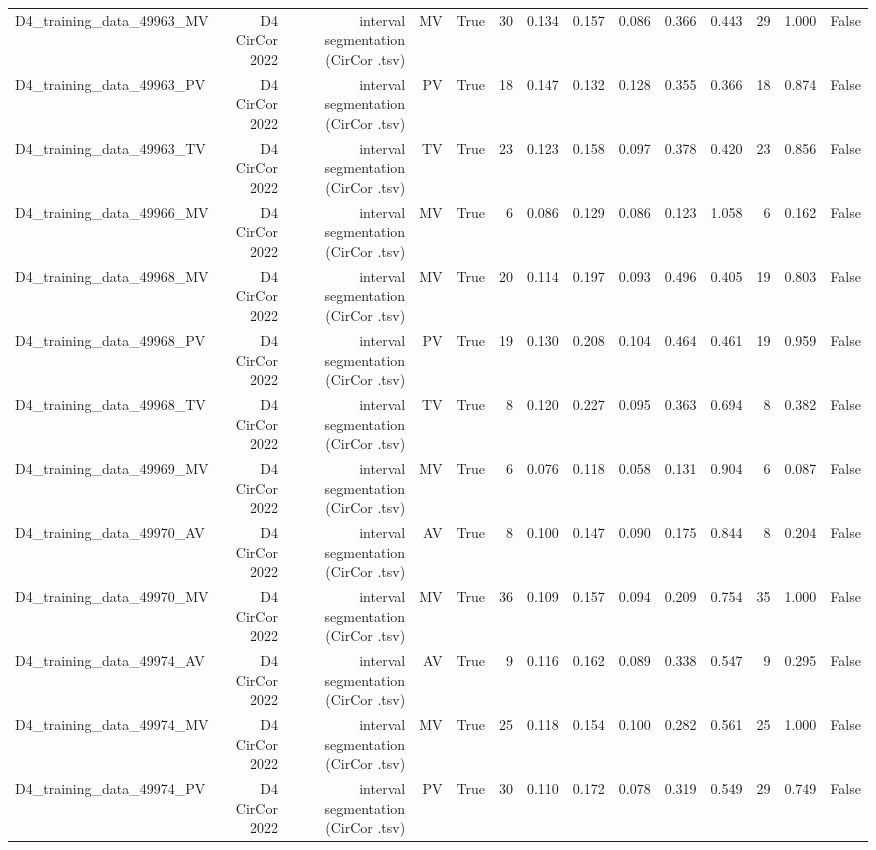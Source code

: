 \begin{table}[htbp]
\begin{tabular}{lrrrrrrrrrrrrr}
    D4\_training\_data\_49963\_MV & D4 CirCor 2022 & interval segmentation (CirCor .tsv) & MV & True & 30 & 0.134 & 0.157 & 0.086 & 0.366 & 0.443 & 29 & 1.000 & False \\
    D4\_training\_data\_49963\_PV & D4 CirCor 2022 & interval segmentation (CirCor .tsv) & PV & True & 18 & 0.147 & 0.132 & 0.128 & 0.355 & 0.366 & 18 & 0.874 & False \\
    D4\_training\_data\_49963\_TV & D4 CirCor 2022 & interval segmentation (CirCor .tsv) & TV & True & 23 & 0.123 & 0.158 & 0.097 & 0.378 & 0.420 & 23 & 0.856 & False \\
    D4\_training\_data\_49966\_MV & D4 CirCor 2022 & interval segmentation (CirCor .tsv) & MV & True & 6 & 0.086 & 0.129 & 0.086 & 0.123 & 1.058 & 6 & 0.162 & False \\
    D4\_training\_data\_49968\_MV & D4 CirCor 2022 & interval segmentation (CirCor .tsv) & MV & True & 20 & 0.114 & 0.197 & 0.093 & 0.496 & 0.405 & 19 & 0.803 & False \\
    D4\_training\_data\_49968\_PV & D4 CirCor 2022 & interval segmentation (CirCor .tsv) & PV & True & 19 & 0.130 & 0.208 & 0.104 & 0.464 & 0.461 & 19 & 0.959 & False \\
    D4\_training\_data\_49968\_TV & D4 CirCor 2022 & interval segmentation (CirCor .tsv) & TV & True & 8 & 0.120 & 0.227 & 0.095 & 0.363 & 0.694 & 8 & 0.382 & False \\
    D4\_training\_data\_49969\_MV & D4 CirCor 2022 & interval segmentation (CirCor .tsv) & MV & True & 6 & 0.076 & 0.118 & 0.058 & 0.131 & 0.904 & 6 & 0.087 & False \\
    D4\_training\_data\_49970\_AV & D4 CirCor 2022 & interval segmentation (CirCor .tsv) & AV & True & 8 & 0.100 & 0.147 & 0.090 & 0.175 & 0.844 & 8 & 0.204 & False \\
    D4\_training\_data\_49970\_MV & D4 CirCor 2022 & interval segmentation (CirCor .tsv) & MV & True & 36 & 0.109 & 0.157 & 0.094 & 0.209 & 0.754 & 35 & 1.000 & False \\
    D4\_training\_data\_49974\_AV & D4 CirCor 2022 & interval segmentation (CirCor .tsv) & AV & True & 9 & 0.116 & 0.162 & 0.089 & 0.338 & 0.547 & 9 & 0.295 & False \\
    D4\_training\_data\_49974\_MV & D4 CirCor 2022 & interval segmentation (CirCor .tsv) & MV & True & 25 & 0.118 & 0.154 & 0.100 & 0.282 & 0.561 & 25 & 1.000 & False \\
    D4\_training\_data\_49974\_PV & D4 CirCor 2022 & interval segmentation (CirCor .tsv) & PV & True & 30 & 0.110 & 0.172 & 0.078 & 0.319 & 0.549 & 29 & 0.749 & False \\

\end{tabular}
\end{table}
